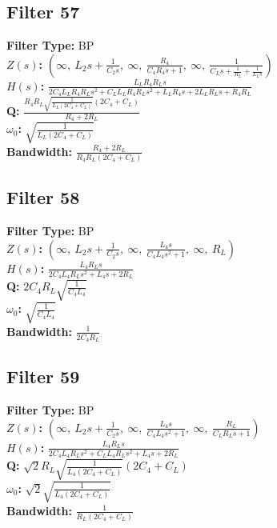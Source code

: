 \documentclass{article}
\begin{document}
\subsection*{Filter 57}
\textbf{Filter Type:} BP \\ 
\textbf{$Z(s)$:} $\left( \infty, \  L_{2} s + \frac{1}{C_{2} s}, \  \infty, \  \frac{R_{4}}{C_{4} R_{4} s + 1}, \  \infty, \  \frac{1}{C_{L} s + \frac{1}{R_{L}} + \frac{1}{L_{L} s}}\right)$ \\ 
\textbf{$H(s)$:} $\frac{L_{L} R_{4} R_{L} s}{2 C_{4} L_{L} R_{4} R_{L} s^{2} + C_{L} L_{L} R_{4} R_{L} s^{2} + L_{L} R_{4} s + 2 L_{L} R_{L} s + R_{4} R_{L}}$ \\ 
\textbf{Q:} $\frac{R_{4} R_{L} \sqrt{\frac{1}{L_{L} \left(2 C_{4} + C_{L}\right)}} \left(2 C_{4} + C_{L}\right)}{R_{4} + 2 R_{L}}$ \\ 
\textbf{$\omega_0$:} $\sqrt{\frac{1}{L_{L} \left(2 C_{4} + C_{L}\right)}}$ \\ 
\textbf{Bandwidth:} $\frac{R_{4} + 2 R_{L}}{R_{4} R_{L} \left(2 C_{4} + C_{L}\right)}$ \\ 
\subsection*{Filter 58}
\textbf{Filter Type:} BP \\ 
\textbf{$Z(s)$:} $\left( \infty, \  L_{2} s + \frac{1}{C_{2} s}, \  \infty, \  \frac{L_{4} s}{C_{4} L_{4} s^{2} + 1}, \  \infty, \  R_{L}\right)$ \\ 
\textbf{$H(s)$:} $\frac{L_{4} R_{L} s}{2 C_{4} L_{4} R_{L} s^{2} + L_{4} s + 2 R_{L}}$ \\ 
\textbf{Q:} $2 C_{4} R_{L} \sqrt{\frac{1}{C_{4} L_{4}}}$ \\ 
\textbf{$\omega_0$:} $\sqrt{\frac{1}{C_{4} L_{4}}}$ \\ 
\textbf{Bandwidth:} $\frac{1}{2 C_{4} R_{L}}$ \\ 
\subsection*{Filter 59}
\textbf{Filter Type:} BP \\ 
\textbf{$Z(s)$:} $\left( \infty, \  L_{2} s + \frac{1}{C_{2} s}, \  \infty, \  \frac{L_{4} s}{C_{4} L_{4} s^{2} + 1}, \  \infty, \  \frac{R_{L}}{C_{L} R_{L} s + 1}\right)$ \\ 
\textbf{$H(s)$:} $\frac{L_{4} R_{L} s}{2 C_{4} L_{4} R_{L} s^{2} + C_{L} L_{4} R_{L} s^{2} + L_{4} s + 2 R_{L}}$ \\ 
\textbf{Q:} $\sqrt{2} R_{L} \sqrt{\frac{1}{L_{4} \left(2 C_{4} + C_{L}\right)}} \left(2 C_{4} + C_{L}\right)$ \\ 
\textbf{$\omega_0$:} $\sqrt{2} \sqrt{\frac{1}{L_{4} \left(2 C_{4} + C_{L}\right)}}$ \\ 
\textbf{Bandwidth:} $\frac{1}{R_{L} \left(2 C_{4} + C_{L}\right)}$ \\ 
\end{document}
